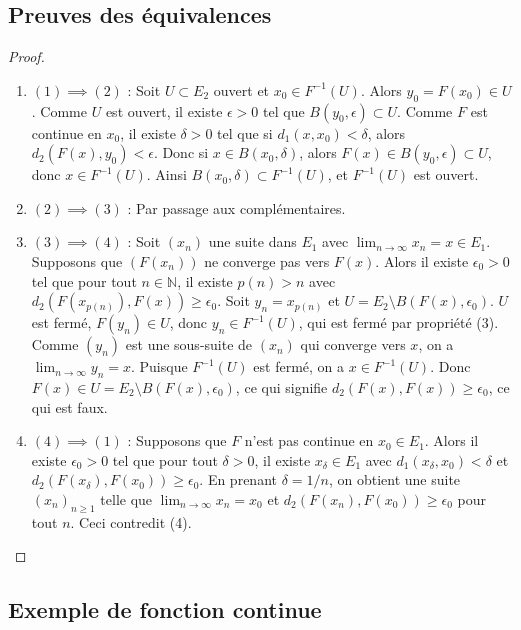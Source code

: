 \documentclass{article}
\begin{document}
\subsection{Preuves des équivalences}

\begin{proof}
\begin{enumerate}
    \item $(1) \implies (2)$ : Soit $U \subset E_2$ ouvert et $x_0 \in F^{-1}(U)$. Alors $y_0 = F(x_0) \in U$. Comme $U$ est ouvert, il existe $\epsilon > 0$ tel que $B(y_0, \epsilon) \subset U$. Comme $F$ est continue en $x_0$, il existe $\delta > 0$ tel que si $d_1(x, x_0) < \delta$, alors $d_2(F(x), y_0) < \epsilon$. Donc si $x \in B(x_0, \delta)$, alors $F(x) \in B(y_0, \epsilon) \subset U$, donc $x \in F^{-1}(U)$. Ainsi $B(x_0, \delta) \subset F^{-1}(U)$, et $F^{-1}(U)$ est ouvert.

    \item $(2) \implies (3)$ : Par passage aux complémentaires.

    \item $(3) \implies (4)$ : Soit $(x_n)$ une suite dans $E_1$ avec $\lim_{n \to \infty} x_n = x \in E_1$. Supposons que $(F(x_n))$ ne converge pas vers $F(x)$. Alors il existe $\epsilon_0 > 0$ tel que pour tout $n \in \mathbb{N}$, il existe $p(n) > n$ avec $d_2(F(x_{p(n)}), F(x)) \geq \epsilon_0$. Soit $y_n = x_{p(n)}$ et $U = E_2 \setminus B(F(x), \epsilon_0)$. $U$ est fermé, $F(y_n) \in U$, donc $y_n \in F^{-1}(U)$, qui est fermé par propriété (3). Comme $(y_n)$ est une sous-suite de $(x_n)$ qui converge vers $x$, on a $\lim_{n \to \infty} y_n = x$. Puisque $F^{-1}(U)$ est fermé, on a $x \in F^{-1}(U)$. Donc $F(x) \in U = E_2 \setminus B(F(x), \epsilon_0)$, ce qui signifie $d_2(F(x), F(x)) \geq \epsilon_0$, ce qui est faux.

    \item $(4) \implies (1)$ : Supposons que $F$ n'est pas continue en $x_0 \in E_1$. Alors il existe $\epsilon_0 > 0$ tel que pour tout $\delta > 0$, il existe $x_\delta \in E_1$ avec $d_1(x_\delta, x_0) < \delta$ et $d_2(F(x_\delta), F(x_0)) \geq \epsilon_0$. En prenant $\delta = 1/n$, on obtient une suite $(x_n)_{n \geq 1}$ telle que $\lim_{n \to \infty} x_n = x_0$ et $d_2(F(x_n), F(x_0)) \geq \epsilon_0$ pour tout $n$. Ceci contredit (4).
\end{enumerate}
\end{proof}

\subsection{Exemple de fonction continue}
\end{document}
